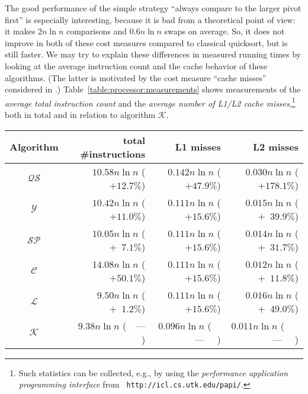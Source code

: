 \documentclass[prodmode,acmtalg]{acmsmall}
\begin{document}
The good performance of the simple strategy ``always compare to the larger pivot first'' is especially interesting, 
because it is bad from a theoretical point of view: it makes $2 n \ln n$ comparisons and $0.6 n \ln n$ swaps on average. So,
it does not improve in both of these cost measures compared to classical quicksort, but is still faster.
We may try to explain these differences in measured running times by looking at
the average instruction count and the cache behavior of these algorithms. (The
latter is motivated by the cost measure ``cache misses'' considered
in \cite{Kushagra14}.) Table~\ref{table:processor:measurements} shows
measurements of the \emph{average total instruction count} and the \emph{average
number of L1/L2 cache misses},\footnote{Such statistics can be collected, e.g.,
    by using the \emph{performance application programming interface} from {\tt
http://icl.cs.utk.edu/papi/}.} both in total and in relation to algorithm
$\mathcal{K}$.

\begin{table}[t]
    {
    \begin{tabular}{c|r|r|r}
        Algorithm & total \#instructions & L1 misses & L2 misses \\ \hline
        $\mathcal{QS}$ & $10.58 n \ln n$ ($+12.7\%$) & $0.142 n \ln n$ ($+47.9\%$) & $0.030 n \ln n$ ($+178.1\%$) \\ 
        $\mathcal{Y}$ & $10.42 n \ln n$ ($+11.0\%$) & $0.111 n \ln n$ ($+15.6\%$) & $0.015 n \ln n$ ($+\phantom{0}39.9\%$) \\ 
        $\mathcal{SP}$ & $10.05 n \ln n$ ($+\phantom{0}7.1\%$) & $0.111 n \ln n$ ($+15.6\%$) & $0.014 n \ln n$ ($+\phantom{0}31.7\%$) \\ 
        $\mathcal{C}$ & $14.08 n \ln n$ ($+50.1\%$) & $0.111 n \ln n$ ($+15.6\%$) & $0.012 n \ln n$ ($+\phantom{0}11.8\%$) \\ 
        $\mathcal{L}$ & $9.50 n \ln n$ ($+\phantom{0}1.2\%$) & $0.111 n \ln n$ ($+15.6\%$) & $0.016 n \ln n$ ($+\phantom{0}49.0\%$) \\ 
        $\mathcal{K}$ & $9.38 n \ln n$ ($\phantom{06}$---$\phantom{0\%}$) & $0.096 n \ln n$ ($\phantom{06}$---$\phantom{0\%}$) & $0.011 n \ln n$ ($\phantom{006}$---$\phantom{0\%}$) \\ 
    \end{tabular}
    }
\end{table}
\end{document}
